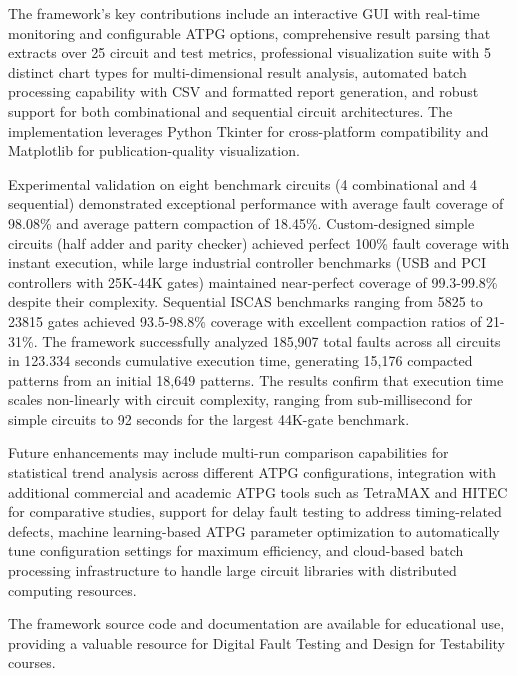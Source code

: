 \documentclass[conference]{IEEEtran}
\begin{document}
The framework's key contributions include an interactive GUI with real-time monitoring and configurable ATPG options, comprehensive result parsing that extracts over 25 circuit and test metrics, professional visualization suite with 5 distinct chart types for multi-dimensional result analysis, automated batch processing capability with CSV and formatted report generation, and robust support for both combinational and sequential circuit architectures. The implementation leverages Python Tkinter for cross-platform compatibility and Matplotlib for publication-quality visualization.

Experimental validation on eight benchmark circuits (4 combinational and 4 sequential) demonstrated exceptional performance with average fault coverage of 98.08\% and average pattern compaction of 18.45\%. Custom-designed simple circuits (half adder and parity checker) achieved perfect 100\% fault coverage with instant execution, while large industrial controller benchmarks (USB and PCI controllers with 25K-44K gates) maintained near-perfect coverage of 99.3-99.8\% despite their complexity. Sequential ISCAS benchmarks ranging from 5825 to 23815 gates achieved 93.5-98.8\% coverage with excellent compaction ratios of 21-31\%. The framework successfully analyzed 185,907 total faults across all circuits in 123.334 seconds cumulative execution time, generating 15,176 compacted patterns from an initial 18,649 patterns. The results confirm that execution time scales non-linearly with circuit complexity, ranging from sub-millisecond for simple circuits to 92 seconds for the largest 44K-gate benchmark.

Future enhancements may include multi-run comparison capabilities for statistical trend analysis across different ATPG configurations, integration with additional commercial and academic ATPG tools such as TetraMAX and HITEC for comparative studies, support for delay fault testing to address timing-related defects, machine learning-based ATPG parameter optimization to automatically tune configuration settings for maximum efficiency, and cloud-based batch processing infrastructure to handle large circuit libraries with distributed computing resources.

The framework source code and documentation are available for educational use, providing a valuable resource for Digital Fault Testing and Design for Testability courses.
\end{document}
